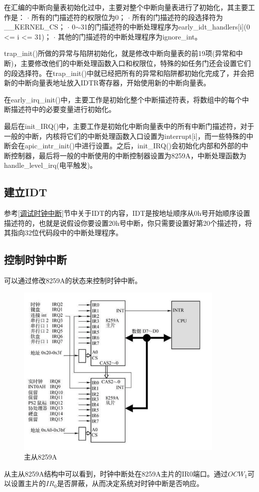 \documentclass[UTF8,12pt]{ctexart}
\begin{document}
    在汇编的中断向量表初始化过中，主要对整个中断向量表进行了初始化，其主要工作是：
    $\cdot$ 所有的门描述符的权限位为0；
    $\cdot$ 所有的门描述符的段选择符为\_\_KERNEL\_CS；
    $\cdot$ 0$\sim$31的门描述符的中断处理程序为early\_idt\_handlers[i](0 <= i <= 31)；
    $\cdot$ 其他的门描述符的中断处理程序为ignore\_int。
    
    trap\_init()所做的异常与陷阱初始化，就是修改中断向量表的前19项(异常和中断)，主要修改他们的中断处理函数入口和权限位，特殊的如任务门还会设置它们的段选择符。在trap\_init()中就已经把所有的异常和陷阱都初始化完成了，并会把新的中断向量表地址放入IDTR寄存器，开始使用新的中断向量表。
    
    在early\_irq\_init()中，主要工作是初始化整个中断描述符表，将数组中的每个中断描述符中的必要变量进行初始化。
    
    最后在init\_IRQ()中，主要工作是初始化中断向量表中的所有中断门描述符，对于一般的中断，内核将它们的中断处理函数入口设置为interrupt[i]，而一些特殊的中断会在apic\_intr\_init()中进行设置。之后，init\_IRQ()会初始化内部和外部的中断控制器，最后将一般的中断使用的中断控制器设置为8259A，中断处理函数为handle\_level\_irq(电平触发)。
    
    \subsection{建立IDT}
    
    参考\ref{调试时钟中断}节中关于IDT的内容，IDT是按地址顺序从0h号开始顺序设置描述符的，也就是说假设你要设置20h号中断，你只需要设置好第20个描述符，将其指向32位代码段中的中断处理程序。
    
    \subsection{控制时钟中断}
    可以通过修改8259A的状态来控制时钟中断。
    \begin{figure}[H]
        \centering
        \includegraphics[width=10cm]{images/2_8259A.png}
        \caption{主从8259A}
        \label{主从8259A}
    \end{figure}
    从主从8259A结构中可以看到，时钟中断处在8259A主片的IR0端口。通过$OCW_1$可以设置主片的$IR_0$是否屏蔽，从而决定系统对时钟中断是否响应。
    
\end{document}
